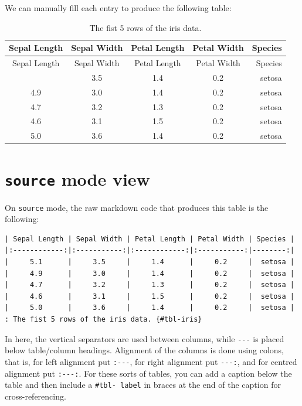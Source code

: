 \documentclass[
  letterpaper,
  DIV=11,
  numbers=noendperiod]{scrartcl}
\begin{document}
We can manually fill each entry to produce the following table:

\begin{longtable}[]{@{}ccccr@{}}
\caption{The fist 5 rows of the iris data.}\tabularnewline
\toprule\noalign{}
Sepal Length & Sepal Width & Petal Length & Petal Width & Species \\
\midrule\noalign{}
\endfirsthead
\toprule\noalign{}
Sepal Length & Sepal Width & Petal Length & Petal Width & Species \\
\midrule\noalign{}
\endhead
\bottomrule\noalign{}
\endlastfoot
5.1 & 3.5 & 1.4 & 0.2 & setosa \\
4.9 & 3.0 & 1.4 & 0.2 & setosa \\
4.7 & 3.2 & 1.3 & 0.2 & setosa \\
4.6 & 3.1 & 1.5 & 0.2 & setosa \\
5.0 & 3.6 & 1.4 & 0.2 & setosa \\
\end{longtable}

\section{\texorpdfstring{\texttt{source} mode view}{source mode view}}

On \texttt{source} mode, the raw markdown code that produces this table
is the following:

\begin{verbatim}
| Sepal Length | Sepal Width | Petal Length | Petal Width | Species |
|:------------:|:-----------:|:------------:|:-----------:|--------:|
|     5.1      |     3.5     |     1.4      |     0.2     |  setosa |
|     4.9      |     3.0     |     1.4      |     0.2     |  setosa |
|     4.7      |     3.2     |     1.3      |     0.2     |  setosa |
|     4.6      |     3.1     |     1.5      |     0.2     |  setosa |
|     5.0      |     3.6     |     1.4      |     0.2     |  setosa |
: The fist 5 rows of the iris data. {#tbl-iris}
\end{verbatim}

In here, the vertical separators \texttt{\textbar{}} are used between
columns, while \texttt{-\/-\/-} is placed below table/column headings.
Alignment of the columns is done using colons, that is, for left
alignment put \texttt{:-\/-\/-}, for right alignment put
\texttt{-\/-\/-:}, and for centred alignment put \texttt{:-\/-\/-:}. For
these sorts of tables, you can add a caption below the table and then
include a \texttt{\#tbl-\ label} in braces at the end of the caption for
cross-referencing.
\end{document}
